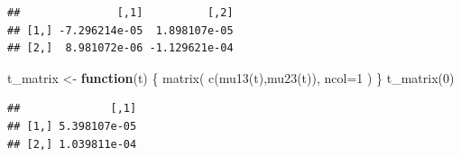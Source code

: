 \documentclass[
]{book}
\newenvironment{Shaded}{\begin{snugshade}}{\end{snugshade}}
\newcommand{\AttributeTok}[1]{\textcolor[rgb]{0.77,0.63,0.00}{#1}}
\newcommand{\ControlFlowTok}[1]{\textcolor[rgb]{0.13,0.29,0.53}{\textbf{#1}}}
\newcommand{\DecValTok}[1]{\textcolor[rgb]{0.00,0.00,0.81}{#1}}
\newcommand{\FunctionTok}[1]{\textcolor[rgb]{0.00,0.00,0.00}{#1}}
\newcommand{\NormalTok}[1]{#1}
\newcommand{\OtherTok}[1]{\textcolor[rgb]{0.56,0.35,0.01}{#1}}
\begin{document}
\begin{verbatim}
##               [,1]          [,2]
## [1,] -7.296214e-05  1.898107e-05
## [2,]  8.981072e-06 -1.129621e-04
\end{verbatim}

\begin{Shaded}
\begin{Highlighting}[]
\NormalTok{t\_matrix }\OtherTok{\textless{}{-}} \ControlFlowTok{function}\NormalTok{(t) \{}
  \FunctionTok{matrix}\NormalTok{(}
    \FunctionTok{c}\NormalTok{(}\FunctionTok{mu13}\NormalTok{(t),}\FunctionTok{mu23}\NormalTok{(t)),}
    \AttributeTok{ncol=}\DecValTok{1}
\NormalTok{  )}
\NormalTok{\}}
\FunctionTok{t\_matrix}\NormalTok{(}\DecValTok{0}\NormalTok{)}
\end{Highlighting}
\end{Shaded}

\begin{verbatim}
##              [,1]
## [1,] 5.398107e-05
## [2,] 1.039811e-04
\end{verbatim}
\end{document}
